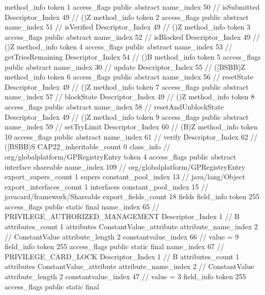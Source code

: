{{{{{				}
				method_info {
					token	1
					access_flags	public abstract
					name_index	50		// isSubmitted
					Descriptor_Index	49		// ()Z
				}
				method_info {
					token	2
					access_flags	public abstract
					name_index	51		// isVerified
					Descriptor_Index	49		// ()Z
				}
				method_info {
					token	3
					access_flags	public abstract
					name_index	52		// isBlocked
					Descriptor_Index	49		// ()Z
				}
				method_info {
					token	4
					access_flags	public abstract
					name_index	53		// getTriesRemaining
					Descriptor_Index	54		// ()B
				}
				method_info {
					token	5
					access_flags	public abstract
					name_index	30		// update
					Descriptor_Index	55		// ([BSBB)Z
				}
				method_info {
					token	6
					access_flags	public abstract
					name_index	56		// resetState
					Descriptor_Index	49		// ()Z
				}
				method_info {
					token	7
					access_flags	public abstract
					name_index	57		// blockState
					Descriptor_Index	49		// ()Z
				}
				method_info {
					token	8
					access_flags	public abstract
					name_index	58		// resetAndUnblockState
					Descriptor_Index	49		// ()Z
				}
				method_info {
					token	9
					access_flags	public abstract
					name_index	59		// setTryLimit
					Descriptor_Index	60		// (B)Z
				}
				method_info {
					token	10
					access_flags	public abstract
					name_index	61		// verify
					Descriptor_Index	62		// ([BSBB)S
				}
			}
			CAP22_inheritable_count	0
		}
		class_info {		// org/globalplatform/GPRegistryEntry
			token	4
			access_flags	public abstract interface shareable
			name_index	109		// org/globalplatform/GPRegistryEntry
			export_supers_count	1
			supers {
				constant_pool_index	13		// java/lang/Object
			}
			export_interfaces_count	1
			interfaces {
				constant_pool_index	15		// javacard/framework/Shareable
			}
			export_fields_count	18
			fields {
			field_info {
				token	255
				access_flags	public static final
				name_index	65		// PRIVILEGE_AUTHORIZED_MANAGEMENT
				Descriptor_Index	1		// B
				attributes_count	1
				attributes {
				ConstantValue_attribute {
					attribute_name_index	2		// ConstantValue
					attribute_length	2
					constantvalue_index	66		// value = 9
				}
				}
			}
			field_info {
				token	255
				access_flags	public static final
				name_index	67		// PRIVILEGE_CARD_LOCK
				Descriptor_Index	1		// B
				attributes_count	1
				attributes {
				ConstantValue_attribute {
					attribute_name_index	2		// ConstantValue
					attribute_length	2
					constantvalue_index	47		// value = 3
				}
				}
			}
			field_info {
				token	255
				access_flags	public static final
}}}}}
